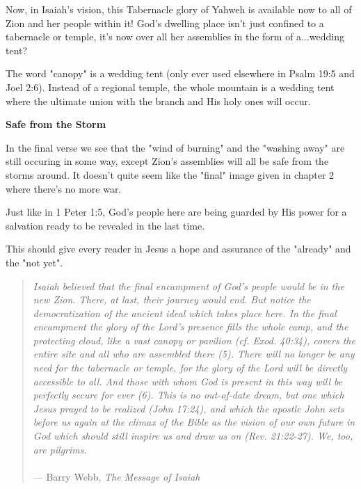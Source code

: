 \documentclass[11pt]{article}
\begin{document}
{\vspace{1em}}

Now, in Isaiah's vision, this Tabernacle glory of Yahweh is available now to all of Zion and her people within it! God's dwelling place isn't just confined to a tabernacle or temple, it's now over all her assemblies in the form of a...wedding tent?

{\vspace{1em}}

The word "canopy" is a wedding tent (only ever used elsewhere in Psalm 19:5 and Joel 2:6). Instead of a regional temple, the whole mountain is a wedding tent where the ultimate union with the branch and His holy ones will occur.

\vspace{3em}
{\large\bfseries Safe from the Storm}
\vspace{1em}

In the final verse we see that the "wind of burning" and the "washing away" are still occuring in some way, except Zion's assemblies will all be safe from the storms around. It doesn't quite seem like the "final" image given in chapter 2 where there's no more war.

Just like in 1 Peter 1:5, God's people here are being guarded by His power for a salvation ready to be revealed in the last time.

This should give every reader in Jesus a hope and assurance of the "already" and the "not yet".

\begin{quote}
\textit{
    Isaiah believed that the final encampment of God's people would be in the new Zion. There, at last, their journey would end. But notice the democratization of the ancient ideal which takes place here. In the final encampment the glory of the Lord's presence fills the whole camp, and the protecting cloud, like a vast canopy or pavilion (cf. Exod. 40:34), covers the entire site and all who are assembled there (5). There will no longer be any need for the tabernacle or temple, for the glory of the Lord will be directly accessible to all. And those with whom God is present in this way will be perfectly secure for ever (6). This is no out-of-date dream, but one which Jesus prayed to be realized (John 17:24), and which the apostle John sets before us again at the climax of the Bible as the vision of our own future in God which should still inspire us and draw us on (Rev. 21:22-27). We, too, are pilgrims.
}
\\\\
\hfill --- Barry Webb, \textit{The Message of Isaiah}
\end{quote}

{\vspace{1em}}
\end{document}
